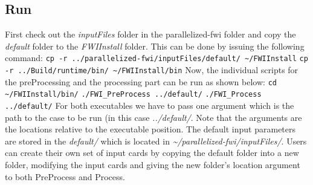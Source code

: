 \documentclass[10pt]{article}
\begin{document}
\subsection{Run}
First check out the \textit{inputFiles} folder in the parallelized-fwi folder and copy the \textit{default} folder to the \textit{FWIInstall} folder. This can be done by issuing the following command:
\newline
\texttt{cp -r ../parallelized-fwi/inputFiles/default/ \textasciitilde/FWIInstall} 
\newline
\texttt{cp -r ../Build/runtime/bin/ \textasciitilde/FWIInstall/bin} 
\newline
Now, the individual scripts for the preProcessing and the processing part can be run as shown below:
\newline
\texttt{cd \textasciitilde/FWIInstall/bin/}
\newline
\texttt{./FWI\_PreProcess ../default/}
\newline
\texttt{./FWI\_Process ../default/}
\newline
\noindent For both executables we have to pass one argument which is the path to the case to be run (in this case \textit{../default/}. Note that the arguments are the locations relative to the executable position. The default input parameters are stored in the \textit{default/} which is located in \textit{\textasciitilde/parallelized-fwi/inputFiles/}. Users can create their own set of input cards by copying the default folder into a new folder, modifying the input cards and giving the new folder's location argument to both PreProcess and Process.\\
\end{document}

